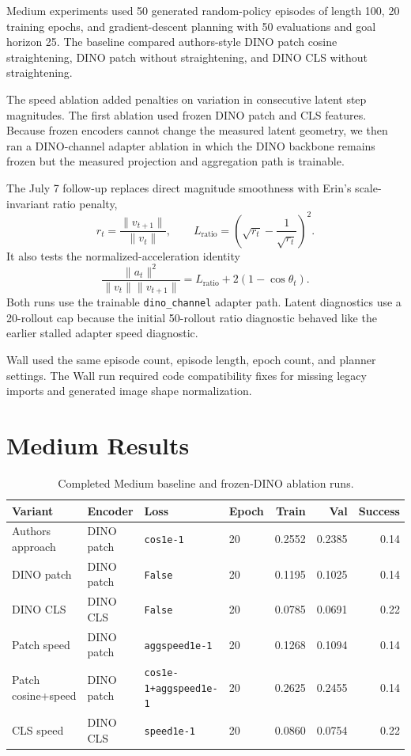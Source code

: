 \documentclass[11pt]{article}
\begin{document}
Medium experiments used 50 generated random-policy episodes of length 100, 20 training epochs, and gradient-descent planning with 50 evaluations and goal horizon 25. The baseline compared authors-style DINO patch cosine straightening, DINO patch without straightening, and DINO CLS without straightening.

The speed ablation added penalties on variation in consecutive latent step magnitudes. The first ablation used frozen DINO patch and CLS features. Because frozen encoders cannot change the measured latent geometry, we then ran a DINO-channel adapter ablation in which the DINO backbone remains frozen but the measured projection and aggregation path is trainable.

The July 7 follow-up replaces direct magnitude smoothness with Erin's scale-invariant ratio penalty,
\[
  r_t = \frac{\|v_{t+1}\|}{\|v_t\|}, \qquad
  L_{\mathrm{ratio}} =
  \left(\sqrt{r_t} - \frac{1}{\sqrt{r_t}}\right)^2.
\]
It also tests the normalized-acceleration identity
\[
  \frac{\|a_t\|^2}{\|v_t\|\|v_{t+1}\|}
  =
  L_{\mathrm{ratio}} + 2(1 - \cos \theta_t).
\]
Both runs use the trainable \texttt{dino\_channel} adapter path. Latent diagnostics use a 20-rollout cap because the initial 50-rollout ratio diagnostic behaved like the earlier stalled adapter speed diagnostic.

Wall used the same episode count, episode length, epoch count, and planner settings. The Wall run required code compatibility fixes for missing legacy imports and generated image shape normalization.

\section{Medium Results}

\begin{table}[h]
\centering
\small
\begin{tabular}{llllrrr}
\toprule
Variant & Encoder & Loss & Epoch & Train & Val & Success \\
\midrule
Authors approach & DINO patch & \texttt{cos1e-1} & 20 & 0.2552 & 0.2385 & 0.14 \\
DINO patch & DINO patch & \texttt{False} & 20 & 0.1195 & 0.1025 & 0.14 \\
DINO CLS & DINO CLS & \texttt{False} & 20 & 0.0785 & 0.0691 & 0.22 \\
Patch speed & DINO patch & \texttt{aggspeed1e-1} & 20 & 0.1268 & 0.1094 & 0.14 \\
Patch cosine+speed & DINO patch & \texttt{cos1e-1+aggspeed1e-1} & 20 & 0.2625 & 0.2455 & 0.14 \\
CLS speed & DINO CLS & \texttt{speed1e-1} & 20 & 0.0860 & 0.0754 & 0.22 \\
\bottomrule
\end{tabular}
\caption{Completed Medium baseline and frozen-DINO ablation runs.}
\end{table}
\end{document}
